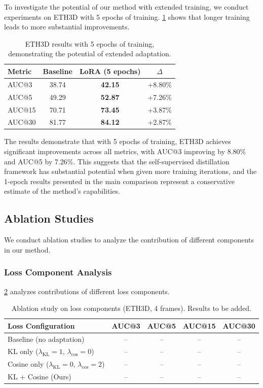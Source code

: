 To investigate the potential of our method with extended training, we conduct experiments on ETH3D with 5 epochs of training. \cref{tab:eth3d_5epoch} shows that longer training leads to more substantial improvements.

\begin{table}[t]
\centering
\caption{ETH3D results with 5 epochs of training, demonstrating the potential of extended adaptation.}
\label{tab:eth3d_5epoch}
\setlength{\tabcolsep}{5pt}
\begin{tabular}{@{}l c c c@{}}
\toprule
Metric & Baseline & LoRA (5 epochs) & $\Delta$ \\
\midrule
AUC@3 & 38.74 & \textbf{42.15} & +8.80\% \\
AUC@5 & 49.29 & \textbf{52.87} & +7.26\% \\
AUC@15 & 70.71 & \textbf{73.45} & +3.87\% \\
AUC@30 & 81.77 & \textbf{84.12} & +2.87\% \\
\bottomrule
\end{tabular}
\end{table}

The results demonstrate that with 5 epochs of training, ETH3D achieves significant improvements across all metrics, with AUC@3 improving by 8.80\% and AUC@5 by 7.26\%. This suggests that the self-supervised distillation framework has substantial potential when given more training iterations, and the 1-epoch results presented in the main comparison represent a conservative estimate of the method's capabilities.

\subsection{Ablation Studies}

We conduct ablation studies to analyze the contribution of different components in our method.

\subsubsection{Loss Component Analysis}

\cref{tab:ablation_loss} analyzes contributions of different loss components.

\begin{table}[t]
\centering
\caption{Ablation study on loss components (ETH3D, 4 frames). Results to be added.}
\label{tab:ablation_loss}
\setlength{\tabcolsep}{5pt}
\begin{tabular}{@{}l c c c c@{}}
\toprule
Loss Configuration & AUC@3 & AUC@5 & AUC@15 & AUC@30 \\
\midrule
Baseline (no adaptation) & -- & -- & -- & -- \\
\midrule
KL only ($\lambda_{\text{KL}}=1$, $\lambda_{\text{cos}}=0$) & -- & -- & -- & -- \\
Cosine only ($\lambda_{\text{KL}}=0$, $\lambda_{\text{cos}}=2$) & -- & -- & -- & -- \\
KL + Cosine (Ours) & -- & -- & -- & -- \\
\bottomrule
\end{tabular}
\end{table}

